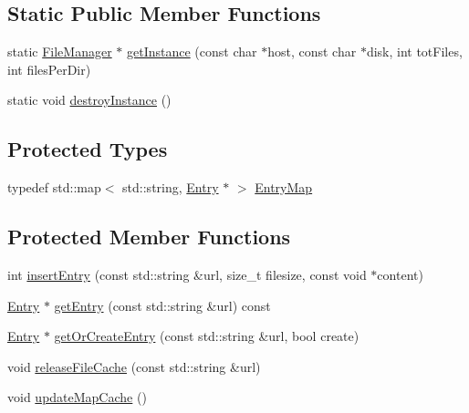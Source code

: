 \subsection*{Static Public Member Functions}
\begin{DoxyCompactItemize}
\item 
static \hyperlink{classmsfs_1_1_file_manager}{File\+Manager} $\ast$ \hyperlink{classmsfs_1_1_file_manager_a44eebff93b8d448b0c3abed6c89277c1}{get\+Instance} (const char $\ast$host, const char $\ast$disk, int tot\+Files, int files\+Per\+Dir)
\item 
static void \hyperlink{classmsfs_1_1_file_manager_ac4644f005c160ccfaea46a7a9538736c}{destroy\+Instance} ()
\end{DoxyCompactItemize}
\subsection*{Protected Types}
\begin{DoxyCompactItemize}
\item 
typedef std\+::map$<$ std\+::string, \hyperlink{structmsfs_1_1_file_manager_1_1_entry}{Entry} $\ast$ $>$ \hyperlink{classmsfs_1_1_file_manager_a645a98d3bf6d0dafa69369db633f7f7f}{Entry\+Map}
\end{DoxyCompactItemize}
\subsection*{Protected Member Functions}
\begin{DoxyCompactItemize}
\item 
int \hyperlink{classmsfs_1_1_file_manager_a83efae8193c47cdec2ce3c54bff57f6f}{insert\+Entry} (const std\+::string \&url, size\+\_\+t filesize, const void $\ast$content)
\item 
\hyperlink{structmsfs_1_1_file_manager_1_1_entry}{Entry} $\ast$ \hyperlink{classmsfs_1_1_file_manager_aa1c283c8d5f8a0bbc012afaf865251ad}{get\+Entry} (const std\+::string \&url) const 
\item 
\hyperlink{structmsfs_1_1_file_manager_1_1_entry}{Entry} $\ast$ \hyperlink{classmsfs_1_1_file_manager_afa727a7272dcd6d0f14136f0849eb281}{get\+Or\+Create\+Entry} (const std\+::string \&url, bool create)
\item 
void \hyperlink{classmsfs_1_1_file_manager_ac1e1707b64e3c88e0f5bbad8c4e32479}{release\+File\+Cache} (const std\+::string \&url)
\item 
void \hyperlink{classmsfs_1_1_file_manager_a0ec42a0deb1bc3e5075871ebc04a7efa}{update\+Map\+Cache} ()
\end{DoxyCompactItemize}
